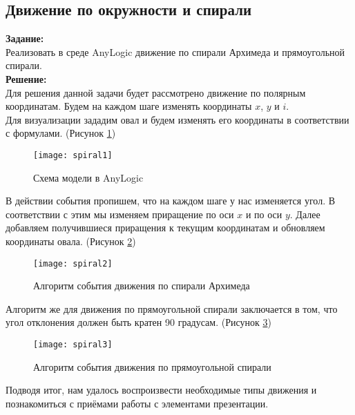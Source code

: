 \subsection*{Движение по окружности и спирали}

\textbf{Задание:}\\
Реализовать в среде AnyLogic движение по спирали Архимеда и прямоугольной спирали.\\

\textbf{Решение:}\\
Для решения данной задачи будет рассмотрено движение по полярным координатам. Будем на каждом шаге изменять координаты $x$, $y$ и $i$.\\

Для визуализации зададим овал и будем изменять его координаты в соответствии с формулами. (Рисунок \ref{fig:spiral1})
\begin{figure}[h]
	\centering \texttt{[image: spiral1]}
	\caption{Схема модели в AnyLogic}
	\label{fig:spiral1}
\end{figure}

В действии события пропишем, что на каждом шаге у нас изменяется угол. В соответствии с этим мы изменяем приращение по оси $x$ и по оси $y$. Далее добавляем получившиеся приращения к текущим координатам и обновляем координаты овала. (Рисунок \ref{fig:spiral2})
\begin{figure}[h]
	\centering \texttt{[image: spiral2]}
	\caption{Алгоритм события движения по спирали Архимеда}
	\label{fig:spiral2}
\end{figure}

\newpage

Алгоритм же для движения по прямоугольной спирали заключается в том, что угол отклонения должен быть кратен 90 градусам. (Рисунок \ref{fig:spiral3})
\begin{figure}[h]
	\centering \texttt{[image: spiral3]}
	\caption{Алгоритм события движения по прямоугольной спирали}
	\label{fig:spiral3}
\end{figure}

Подводя итог, нам удалось воспроизвести необходимые типы движения и познакомиться с приёмами работы с элементами презентации.